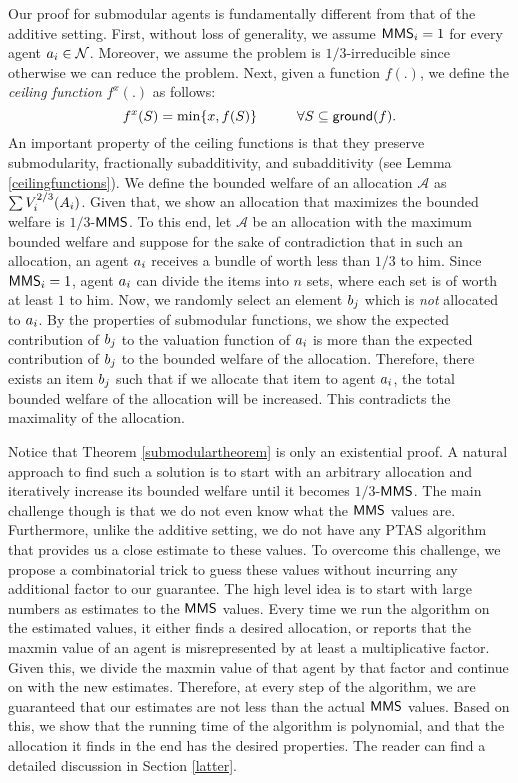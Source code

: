 Our proof for submodular agents is fundamentally different from that of the additive setting. First, without loss of generality, we assume $\mathsf{MMS}_i = 1$ for every agent $a_i \in \mathcal{N}$. Moreover, we assume the problem is $1/3$-irreducible since otherwise we can reduce the problem. Next, given a function $f(.)$, we define the \textit{ceiling function} $f^x(.)$ as follows:
$$f^x(S) = \min\{x, f(S)\} \hspace{1cm}\forall S \subseteq \mathsf{ground}(f).$$
An important property of the ceiling functions is that they preserve submodularity, fractionally subadditivity, and subadditivity (see Lemma \ref{ceilingfunctions}). We define the bounded welfare of an allocation $\mathcal{A}$ as $\sum V_i^{2/3}(A_i)$. Given that, we show an allocation that maximizes the bounded welfare is $1/3$-$\mathsf{MMS}$. To this end, let $\mathcal{A}$ be an allocation with the maximum bounded welfare and suppose for the sake of contradiction that in such an allocation, an agent $a_i$ receives a bundle of worth less than $1/3$ to him. Since $\mathsf{MMS}_i = 1$, agent $a_i$ can divide the items into $n$ sets, where each set is of worth at least $1$ to him. Now, we randomly select an element $b_j$ which is \textit{not} allocated to $a_i$. By the properties of submodular functions, we show the expected contribution of $b_j$ to the valuation function of $a_i$ is more than the expected contribution of $b_j$ to the bounded welfare of the allocation. Therefore, there exists an item $b_j$ such that if we allocate that item to agent $a_i$, the total bounded welfare of the allocation will be increased. This contradicts the maximality of the allocation.

Notice that Theorem \ref{submodulartheorem} is only an existential proof. A natural approach to find such a solution is to start with an arbitrary allocation and iteratively increase its bounded welfare until it becomes $1/3$-$\mathsf{MMS}$. The main challenge though is that we do not even know what the $\mathsf{MMS}$ values are. Furthermore, unlike the additive setting, we do not have any PTAS algorithm that provides us a close estimate to these values. To overcome this challenge, we propose a combinatorial trick to guess these values without incurring any additional factor to our guarantee. The high level idea is to start with large numbers as estimates to the $\mathsf{MMS}$ values. Every time we run the algorithm on the estimated values, it either finds a desired allocation, or reports that the maxmin value of an agent is misrepresented by at least a multiplicative factor. Given this, we divide the maxmin value of that agent by that factor and continue on with the new estimates. Therefore, at every step of the algorithm, we are guaranteed that our estimates are not less than the actual $\mathsf{MMS}$ values. Based on this, we show that the running time of the algorithm is polynomial, and that the allocation it finds in the end has the desired properties. The reader can find a detailed discussion in Section \ref{latter}.

